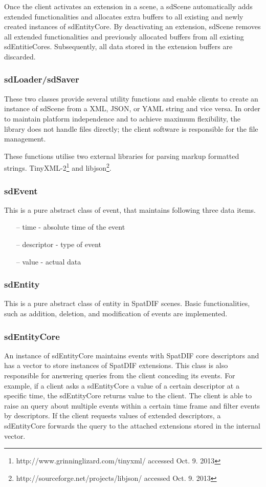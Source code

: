 \documentclass[a4paper]{article}
\begin{document}
Once the client activates an extension in a scene, a sdScene automatically adds extended functionalities and allocates extra buffers to all existing and newly created instances of sdEntityCore. 
By deactivating an extension, sdScene removes all extended functionalities and previously allocated buffers from all existing sdEntitieCores. 
Subsequently, all data stored in the extension buffers are discarded.

\subsubsection{sdLoader/sdSaver}
These two classes provide several utility functions and enable clients to create an instance of sdScene from a XML, JSON, or YAML string and vice versa. 
In order to maintain platform independence and to achieve maximum flexibility, the library does not handle files directly; the client software is responsible for the file management. 

These functions utilise two external libraries for parsing markup formatted strings. TinyXML-2\footnote{http://www.grinninglizard.com/tinyxml/ accessed Oct. 9. 2013} and libjson\footnote{http://sourceforge.net/projects/libjson/ accessed Oct. 9. 2013}.

\subsubsection{sdEvent}
This is a pure abstract class of event, that maintains following three data items.

\begin{itemize}[leftmargin=*]
\item[--] time - absolute time of the event
\item[--] descriptor - type of event
\item[--] value - actual data
\end{itemize}

\subsubsection{sdEntity}
This is a pure abstract class of entity in SpatDIF scenes. Basic functionalities, such as addition, deletion, and modification of events are implemented.

\subsubsection{sdEntityCore}
An instance of sdEntityCore maintains events with SpatDIF core descriptors and has a vector to store instances of SpatDIF extensions. 
This class is also responsible for answering queries from the client conceding its events. For example, if a client asks a sdEntityCore a value of a certain descriptor at a specific time, the sdEntityCore returns value to the client. 
The client is able to raise an query about multiple events within a certain time frame and filter events by descriptors. If the client requests values of extended descriptors, a sdEntityCore forwards the query to the attached extensions stored in the internal vector.
\end{document}
